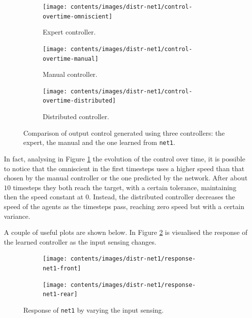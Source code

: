 \begin{figure}[!htb]
	\centering
	\begin{subfigure}[h]{0.3\textwidth}
		\centering
		\texttt{[image: contents/images/distr-net1/control-overtime-omniscient]}%
		\caption{Expert controller.}
	\end{subfigure}
	\hfill
	\begin{subfigure}[h]{0.3\textwidth}
		\centering
		\texttt{[image: contents/images/distr-net1/control-overtime-manual]}%
		\caption{Manual controller.}
	\end{subfigure}
	\hfill
	\begin{subfigure}[h]{0.3\textwidth}
		\centering
		\texttt{[image: contents/images/distr-net1/control-overtime-distributed]}
		\caption{Distributed controller.}
	\end{subfigure}
	\caption[Evaluation of the control learned by \texttt{net1}.]{Comparison 
		of output control generated using three controllers: the expert, the manual 
		and the one learned from \texttt{net1}.}
	\label{fig:net1control}
\end{figure}

In fact, analysing in Figure \ref{fig:net1control} the evolution of the control over 
time, it is possible to notice that the omniscient in the first timesteps uses a 
higher speed than that chosen by the manual controller or the one predicted by 
the network. After about $10$ timesteps they both reach the target, with a 
certain tolerance, maintaining then the speed constant at $0$. Instead, the 
distributed controller decreases the speed of the agents as the timesteps pass, 
reaching zero speed but with a certain variance.

A couple of useful plots are shown below. In Figure \ref{fig:net1responsesensors} 
is visualised the response of the learned controller as the input sensing changes. 
\begin{figure}[!htb]
	\centering
	\begin{subfigure}[h]{0.49\textwidth}
		\centering
		\texttt{[image: contents/images/distr-net1/response-net1-front]}%
	\end{subfigure}
	\hfill
	\begin{subfigure}[h]{0.49\textwidth}
		\centering
		\texttt{[image: contents/images/distr-net1/response-net1-rear]}
	\end{subfigure}
	\caption[Response of \texttt{net1} by varying the input sensing.]{Response of 
		\texttt{net1} by varying the input sensing.}
	\label{fig:net1responsesensors}
\end{figure}

